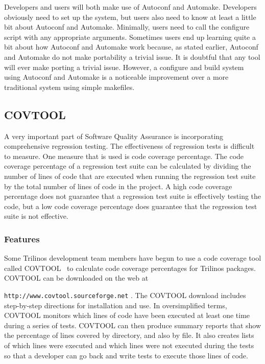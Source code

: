 \documentclass[12pt,relax]{article}
\newcommand{\InlineDirectory}[1]{
  {\hspace{0.01 in}} {\tt #1} {\hspace{0.01 in}}}
\begin{document}
Developers and users will both make use of Autoconf and Automake.  Developers 
obviously need to set up the system, but users also need to know at least a 
little bit about Autoconf and Automake.  Minimally, users need to call the 
configure script with any appropriate arguments.  Sometimes users end up 
learning quite a bit about how Autoconf and Automake work because, as stated 
earlier, Autoconf and Automake do not make portability a trivial issue.  It is 
doubtful that any tool will ever make porting a trivial issue.  However, a 
configure and build system using Autoconf and Automake is a 
noticeable improvement over a more traditional system using simple makefiles.

\subsection{COVTOOL}

A very important part of Software Quality Assurance is incorporating 
comprehensive regression testing.  The effectiveness of regression tests is 
difficult to measure.  One measure that is used is code coverage percentage.  
The code coverage percentage of a regression test suite can be calculated by 
dividing the number of lines of code that are executed when running the 
regression test suite by the total number of lines of code in the project.
A high code coverage percentage does not guarantee that a regression test 
suite is effectively testing the code, but a low code coverage percentage does 
guarantee that the regression test suite is not effective.

\subsubsection{Features}

Some Trilinos development team members have begun to use a code coverage tool 
called COVTOOL~\cite{COVTOOL} to calculate code coverage percentages for 
Trilinos packages.  COVTOOL can be downloaded on the web at \newline
\InlineDirectory{http://www.covtool.sourceforge.net}.  The COVTOOL download 
includes step-by-step directions for installation and use.  In oversimplified
terms, COVTOOL monitors which lines of code have been executed at least one 
time during a series of tests.  COVTOOL can then produce summary reports that 
show the percentage of lines covered by directory, and also by file.  It also 
creates lists of which lines were executed and which lines were not executed 
during the tests so that a developer can go back and write tests to execute 
those lines of code.
\end{document}
